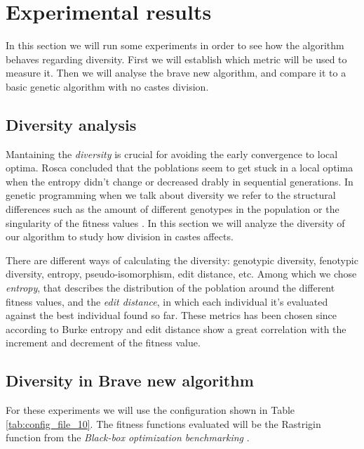 \section{Experimental results}
\label{sec:experiments}

In this section we will run some experiments in order to see how the algorithm
behaves regarding diversity.  First we will establish which metric will be
used to measure it. Then we will analyse the brave new algorithm, and compare
it to a basic genetic algorithm with no castes division.

\subsection{Diversity analysis}

Mantaining the \emph{diversity} is crucial for avoiding the early convergence to local optima. Rosca \cite{Rosca} concluded that 
the poblations seem to get stuck in a local optima when the entropy didn't change or decreased drably in sequential generations.
In genetic programming when we talk about diversity we refer to the structural differences such as the amount of different
genotypes in the population or the singularity of the fitness values \cite{genetic}. In this section we will analyze the diversity of our
algorithm to study how division in castes affects.

There are different ways of calculating the diversity: genotypic diversity, fenotypic diversity, entropy, pseudo-isomorphism, edit distance, etc.
Among which we chose \textit{entropy}, that describes the distribution of the poblation around the different fitness values, and the \textit{edit distance},
in which each individual it's evaluated against the best individual found so far. These metrics has been chosen since according to Burke \cite{diversity} entropy
and edit distance show a great correlation with the increment and decrement of the fitness value.

\subsection{Diversity in Brave new algorithm}

For these experiments we will use the configuration shown in Table \ref{tab:config_file_10}. The fitness functions evaluated will be the Rastrigin
function from the \emph{Black-box optimization benchmarking} \cite{BBOB}.

